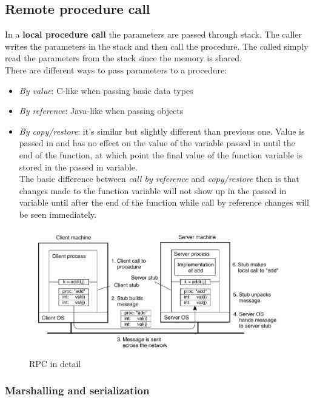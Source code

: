 \subsection{Remote procedure call}
In a \textbf{local procedure call} the parameters are passed through stack. The caller writes the parameters in the stack and then call the procedure. The called simply read the parameters from the stack since the memory is shared.\\
There are different ways to pass parameters to a procedure:
\begin{itemize}
    \item \textit{By value}: C-like when passing basic data types
    \item \textit{By reference}: Java-like when passing objects
    \item \textit{By copy/restore}: it's similar but slightly different than previous one. Value is passed in and has no effect on the value of the variable passed in until the end of the function, at which point the final value of the function variable is stored in the passed in variable.\\
    The basic difference between \textit{call by reference} and \textit{copy/restore} then is that changes made to the function variable will not show up in the passed in variable until after the end of the function while call by reference changes will be seen immediately.
\end{itemize}

\begin{figure}[h]
\caption{RPC in detail}
\includegraphics[width=\textwidth]{src/images/rpc-in-detail.png}
\centering
\end{figure}

\subsubsection{Marshalling and serialization}

